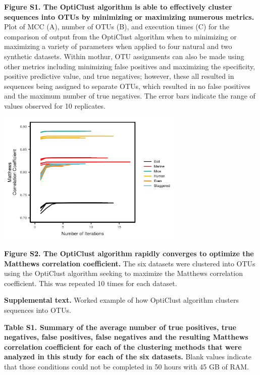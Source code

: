 \documentclass[11pt,]{article}
\begin{document}
\textbf{Figure S1. The OptiClust algorithm is able to effectively
cluster sequences into OTUs by minimizing or maximizing numerous
metrics.} Plot of MCC (A), number of OTUs (B), and execution times (C)
for the comparison of output from the OptiClust algorithm when to
minimizing or maximizing a variety of parameters when applied to four
natural and two synthetic datasets. Within mothur, OTU assignments can
also be made using other metrics including minimizing false positives
and maximizing the specificity, positive predictive value, and true
negatives; however, these all resulted in sequences being assigned to
separate OTUs, which resulted in no false positives and the maximum
number of true negatives. The error bars indicate the range of values
observed for 10 replicates.

\newpage

\includegraphics[width=3.5in]{results/figures/optimization.png}

\textbf{Figure S2. The OptiClust algorithm rapidly converges to optimize
the Matthews correlation coefficient.} The six datasets were clustered
into OTUs using the OptiClust algorithm seeking to maximize the Matthews
correlation coefficient. This was repeated 10 times for each dataset.

\newpage

\newpage

\textbf{Supplemental text.} Worked example of how OptiClust algorithm
clusters sequences into OTUs.

\textbf{Table S1. Summary of the average number of true positives, true
negatives, false positives, false negatives and the resulting Matthews
correlation coefficient for each of the clustering methods that were
analyzed in this study for each of the six datasets.} Blank values
indicate that those conditions could not be completed in 50 hours with
45 GB of RAM.

\newpage
\end{document}

